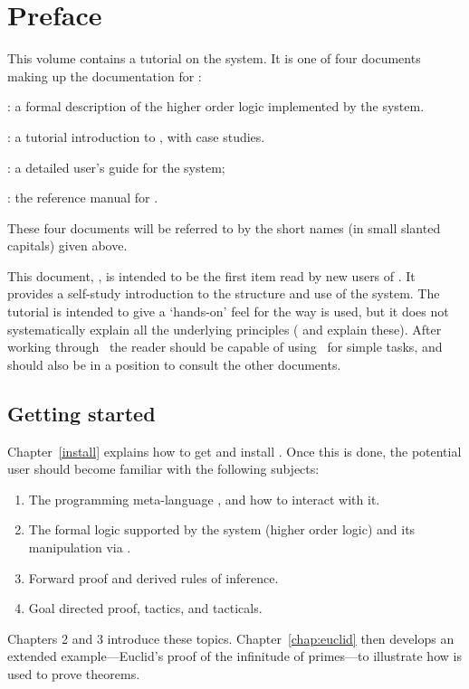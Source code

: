 \chapter*{Preface}
\label{intro}

This volume contains a tutorial on the \HOL{} system.  It is one of four
documents making up the documentation for \HOL:

\begin{myenumerate}
\item \LOGIC: a formal description of the higher order logic
  implemented by the \HOL{} system.
\item \TUTORIAL: a tutorial introduction to \HOL, with case studies.
\item \DESCRIPTION: a detailed user's guide for the \HOL{} system;
\item \REFERENCE: the reference manual for \HOL.
\end{myenumerate}

\noindent These four documents will be referred to by the short names (in
small slanted capitals) given above.

This document, \TUTORIAL, is intended to be the first item read by new
users of \HOL.  It provides a self-study introduction to the structure
and use of the system.  The tutorial is intended to give a `hands-on'
feel for the way \HOL{} is used, but it does not systematically
explain all the underlying principles (\DESCRIPTION{} and \LOGIC{}
explain these).  After working through \TUTORIAL\ the reader should be
capable of using \HOL\ for simple tasks, and should also be in a
position to consult the other documents.

\section*{Getting started}

Chapter~\ref{install} explains how to get and install \HOL.  Once this
is done, the potential \HOL{} user should become familiar with the
following subjects:
%
\begin{enumerate}
\item The programming meta-language \ML, and how to interact with it.
\item The formal logic supported by the \HOL{} system (higher order
  logic) and its manipulation via \ML.
\item Forward proof and derived rules of inference.
\item Goal directed proof, tactics, and tacticals.
\end{enumerate}
%
Chapters 2 and 3 introduce these topics.
Chapter~\ref{chap:euclid} then develops an extended example---Euclid's
proof of the infinitude of primes---to illustrate how \HOL{} is used
to prove theorems.

